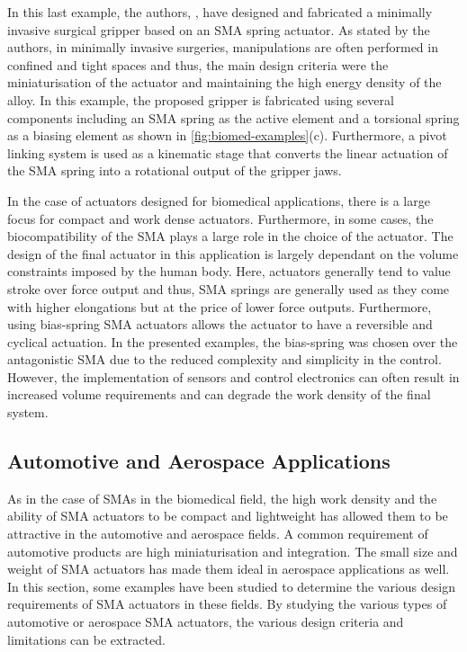 In this last example, the authors, \cite{roshanDesignFabricationMinimally2018}, have designed and fabricated a minimally invasive surgical gripper based on an SMA spring actuator. As stated by the authors, in minimally invasive surgeries, manipulations are often performed in confined and tight spaces and thus, the main design criteria were the miniaturisation of the actuator and maintaining the high energy density of the alloy. In this example, the proposed gripper is fabricated using several components including an SMA spring as the active element and a torsional spring as a biasing element as shown in \cref{fig:biomed-examples}(c). Furthermore, a pivot linking system is used as a kinematic stage that converts the linear actuation of the SMA spring into a rotational output of the gripper jaws.

In the case of actuators designed for biomedical applications, there is a large focus for compact and work dense actuators. Furthermore, in some cases, the biocompatibility of the SMA plays a large role in the choice of the actuator. The design of the final actuator in this application is largely dependant on the volume constraints imposed by the human body. Here, actuators generally tend to value stroke over force output and thus, SMA springs are generally used as they come with higher elongations but at the price of lower force outputs. Furthermore, using bias-spring SMA actuators allows the actuator to have a reversible and cyclical actuation. In the presented examples, the bias-spring was chosen over the antagonistic SMA due to the reduced complexity and simplicity in the control. However, the implementation of sensors and control electronics can often result in increased volume requirements and can degrade the work density of the final system.

\subsection{Automotive and Aerospace Applications}
As in the case of SMAs in the biomedical field, the high work density and the ability of SMA actuators to be compact and lightweight has allowed them to be attractive in the automotive and aerospace fields. A common requirement of automotive products are high miniaturisation and integration. The small size and weight of SMA actuators has made them ideal in aerospace applications as well. In this section, some examples have been studied to determine the various design requirements of SMA actuators in these fields. By studying the various types of automotive or aerospace SMA actuators, the various design criteria and limitations can be extracted.

